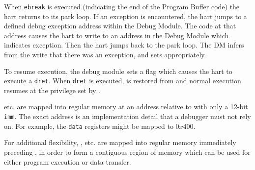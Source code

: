 When {\tt ebreak} is executed (indicating the end of the
Program Buffer code) the hart returns to its park loop. If an exception is
encountered, the hart jumps to a defined debug exception address within
the Debug Module. The code at that address causes the hart to
write to an address in the Debug Module which indicates exception.
Then the hart jumps back to the park loop.
The DM infers from the write that there was an exception, and sets \Fcmderr appropriately.

To resume execution, the debug module sets a flag which causes the hart to execute a {\tt dret}.
When {\tt dret} is executed, \Rpc is restored from \Rdpc and normal execution resumes at the
privilege set by \Fprv.

\Rdatazero etc. are mapped into regular memory at an address relative to \Rzero
with only a 12-bit {\tt imm}. The exact address is an implementation
detail that a debugger must not rely on. For example, the {\tt data}
registers might be mapped to $0x400$.

For additional flexibility, \Rprogbufzero, etc. are mapped into regular memory
immediately preceding \Rdatazero, in order to form a contiguous region of memory which
can be used for either program execution or data transfer.
